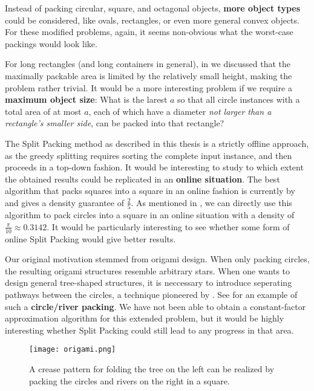 \documentclass[a4paper,style=print,bibliography=totoc,nexus,lnum,extramargin]{tubsbook}
\begin{document}
Instead of packing circular, square, and octagonal objects, \textbf{more object types} could be considered, like ovals, rectangles, or even more general convex objects. For these modified problems, again, it seems non-obvious what the worst-case packings would look like.

For long rectangles (and long containers in general), in  we discussed that the maximally packable area is limited by the relatively small height, making the problem rather trivial. It would be a more interesting problem if we require a \textbf{maximum object size}: What is the larest $a$ so that all circle instances with a total area of at most $a$, each of which have a diameter \emph{not larger than a rectangle's smaller side}, can be packed into that rectangle?

The Split Packing method as described in this thesis is a strictly offline approach, as the greedy splitting requires sorting the complete input instance, and then proceeds in a top-down fashion. It would be interesting to study to which extent the obtained results could be replicated in an \textbf{online situation}. The best algorithm that packs squares into a square in an online fashion is currently by \textcite{brubach2014improved} and gives a density guarantee of $\frac{2}{5}$. As mentioned in , we can directly use this algorithm to pack circles into a square in an online situation with a density of $\frac{\pi}{10} \approx 0.3142$. It would be particularly interesting to see whether some form of online Split Packing would give better results.

Our original motivation stemmed from origami design. When only packing circles, the resulting origami structures resemble arbitrary stars. When one wants to design general tree-shaped structures, it is neccessary to introduce seperating pathways between the circles, a technique pioneered by \textcite{lang1996computational}. See  for an example of such a \textbf{circle/river packing}. We have not been able to obtain a constant-factor approximation algorithm for this extended problem, but it would be highly interesting whether Split Packing could still lead to any progress in that area.

\begin{figure}
    \texttt{[image: origami.png]}
    \caption{A crease pattern for folding the tree on the left can be realized by packing the circles and rivers on the right in a square.}\label{fig:origami}
\end{figure}
\end{document}
